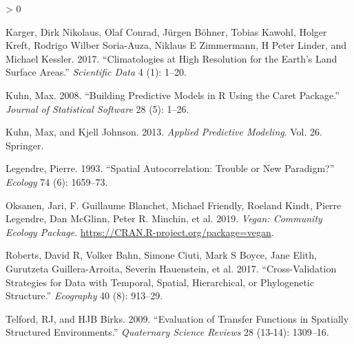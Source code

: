 \documentclass[
]{article}
\newlength{\cslhangindent}
\newenvironment{CSLReferences}[2] %
 {%
  \setlength{\parindent}{0pt}
  \ifodd #1 \everypar{\setlength{\hangindent}{\cslhangindent}}\ignorespaces\fi
  \ifnum #2 > 0
  \setlength{\parskip}{#2\baselineskip}
  \fi
 }%
 {}
\begin{document}
\begin{CSLReferences}{1}{0}
\leavevmode\hypertarget{ref-karger2017climatologies}{}%
Karger, Dirk Nikolaus, Olaf Conrad, Jürgen Böhner, Tobias Kawohl, Holger Kreft, Rodrigo Wilber Soria-Auza, Niklaus E Zimmermann, H Peter Linder, and Michael Kessler. 2017. {``Climatologies at High Resolution for the Earth's Land Surface Areas.''} \emph{Scientific Data} 4 (1): 1--20.

\leavevmode\hypertarget{ref-Kuhn2008-cc}{}%
Kuhn, Max. 2008. {``Building Predictive Models in {R} Using the Caret Package.''} \emph{Journal of Statistical Software} 28 (5): 1--26.

\leavevmode\hypertarget{ref-Kuhn2013-cp}{}%
Kuhn, Max, and Kjell Johnson. 2013. \emph{Applied Predictive Modeling}. Vol. 26. Springer.

\leavevmode\hypertarget{ref-legendre1993spatial}{}%
Legendre, Pierre. 1993. {``Spatial Autocorrelation: Trouble or New Paradigm?''} \emph{Ecology} 74 (6): 1659--73.

\leavevmode\hypertarget{ref-Oksanen_2019}{}%
Oksanen, Jari, F. Guillaume Blanchet, Michael Friendly, Roeland Kindt, Pierre Legendre, Dan McGlinn, Peter R. Minchin, et al. 2019. \emph{Vegan: Community Ecology Package}. \url{https://CRAN.R-project.org/package=vegan}.

\leavevmode\hypertarget{ref-roberts2017cross}{}%
Roberts, David R, Volker Bahn, Simone Ciuti, Mark S Boyce, Jane Elith, Gurutzeta Guillera-Arroita, Severin Hauenstein, et al. 2017. {``Cross-Validation Strategies for Data with Temporal, Spatial, Hierarchical, or Phylogenetic Structure.''} \emph{Ecography} 40 (8): 913--29.

\leavevmode\hypertarget{ref-telford2009evaluation}{}%
Telford, RJ, and HJB Birks. 2009. {``Evaluation of Transfer Functions in Spatially Structured Environments.''} \emph{Quaternary Science Reviews} 28 (13-14): 1309--16.

\end{CSLReferences}
\end{document}
